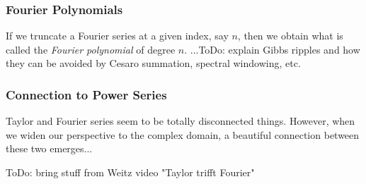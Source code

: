 






\subsubsection{Fourier Polynomials}
If we truncate a Fourier series at a given index, say $n$, then we obtain what is called the \emph{Fourier polynomial} of degree $n$. ...ToDo: explain Gibbs ripples and how they can be avoided by Cesaro summation, spectral windowing, etc.






\subsubsection{Connection to Power Series}
Taylor and Fourier series seem to be totally disconnected things. However, when we widen our perspective to the complex domain, a beautiful connection between these two emerges...

\medskip
ToDo: bring stuff from Weitz video "Taylor trifft Fourier"


